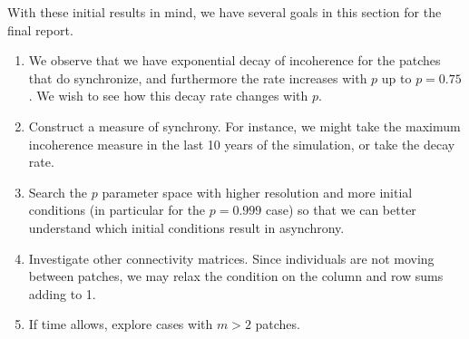 \documentclass[12pt]{article}
\begin{document}
With these initial results in mind, we have several goals in this section for the final report.
\begin{enumerate}
\item We observe that we have exponential decay of incoherence for the patches that do synchronize, and furthermore the rate increases with $p$ up to $p = 0.75$. We wish to see how this decay rate changes with $p$.
\item Construct a measure of synchrony. For instance, we might take the maximum incoherence measure in the last 10 years of the simulation, or take the decay rate.
\item Search the $p$ parameter space with higher resolution and more initial conditions (in particular for the $p = 0.999$ case) so that we can better understand which initial conditions result in asynchrony.
\item Investigate other connectivity matrices. Since individuals are not moving between patches, we may relax the condition on the column and row sums adding to 1.
\item If time allows, explore cases with $m > 2$ patches.
\end{enumerate}
\end{document}
